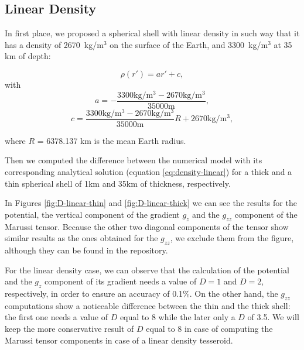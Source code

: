 \documentclass[extra]{gji}
\begin{document}
\subsection{Linear Density}

In first place, we proposed a spherical shell with linear density in such way that it has a density of 2670~kg/m$^3$ on the surface of the Earth, and 3300~kg/m$^3$ at 35 km of depth:

\begin{equation}
    \rho(r') = ar' + c,
    \label{eq:density-linear}
\end{equation}
\noindent with 
\begin{equation}
    a = -\frac{3300\text{kg/m$^3$} - 2670\text{kg/m$^3$}}{35000\text{m}},
\end{equation}
\begin{equation}
    c = \frac{3300\text{kg/m$^3$} - 
        2670\text{kg/m$^3$}}{35000\text{m}} R + 
        2670\text{kg/m$^3$},
\end{equation}

\noindent where $R$ = 6378.137 km is the mean Earth radius.

Then we computed the difference between the numerical model with its corresponding analytical solution (equation \ref{eq:density-linear}) for a thick and a thin spherical shell of 1km and 35km of thickness, respectively.

In Figures \ref{fig:D-linear-thin} and \ref{fig:D-linear-thick} we can see the results for the potential, the vertical component of the gradient $g_z$ and the $g_{zz}$ component of the Marussi tensor.
Because the other two diagonal components of the tensor show similar results as the ones obtained for the $g_{zz}$, we exclude them from the figure, although they can be found in the repository. 

For the linear density case, we can observe that the calculation of the potential and the $g_z$ component of its gradient needs a value of $D=1$ and $D=2$, respectively, in order to ensure an accuracy of 0.1\%.
On the other hand, the $g_{zz}$ computations show a noticeable difference between the thin and the thick shell: the first one needs a value of $D$ equal to 8 while the later only a $D$ of 3.5.
We will keep the more conservative result of $D$ equal to 8 in case of computing the Marussi tensor components in case of a linear density tesseroid.
\end{document}
